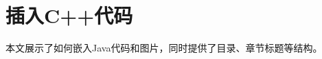 \documentclass[10pt]{article}
\begin{document}
\newpage
\section{插入C++代码}
%
%
%

本文展示了如何嵌入Java代码和图片，同时提供了目录、章节标题等结构。
\end{document}
